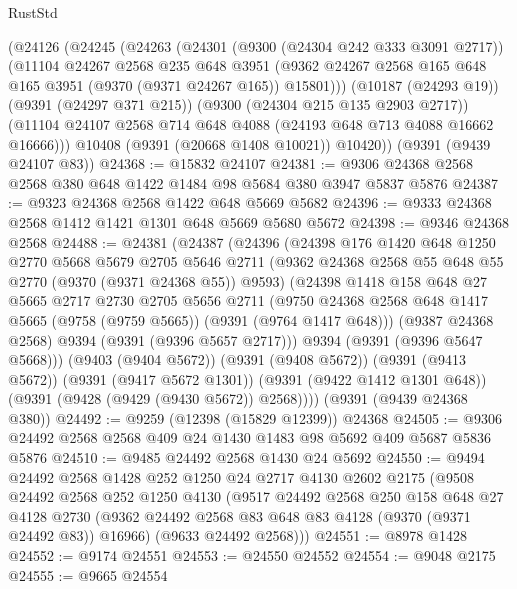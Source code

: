 \begin{lexlean}{RustStd}
\begin{coremodule}
    (@24126
      (@24245
        (@24263
          (@24301
            (@9300 (@24304 @242 @333 @3091 @2717))
            (@11104
              @24267
              @2568
              @235
              @648
              @3951
              (@9362 @24267 @2568 @165 @648 @165 @3951 (@9370 (@9371 @24267 @165)) @15801)))
          (@10187 (@24293 @19))
          (@9391 (@24297 @371 @215))
          (@9300 (@24304 @215 @135 @2903 @2717))
          (@11104 @24107 @2568 @714 @648 @4088 (@24193 @648 @713 @4088 @16662 @16666)))
        @10408
        (@9391 (@20668 @1408 @10021))
        @10420))
    (@9391 (@9439 @24107 @83))
@24368 := @15832 @24107
@24381 := @9306 @24368 @2568 @2568 @380 @648 @1422 @1484 @98 @5684 @380 @3947 @5837 @5876
@24387 := @9323 @24368 @2568 @1422 @648 @5669 @5682
@24396 := @9333 @24368 @2568 @1412 @1421 @1301 @648 @5669 @5680 @5672
@24398 := @9346 @24368 @2568
@24488 := @24381
    (@24387
      (@24396
        (@24398
          @176
          @1420
          @648
          @1250
          @2770
          @5668
          @5679
          @2705
          @5646
          @2711
          (@9362 @24368 @2568 @55 @648 @55 @2770 (@9370 (@9371 @24368 @55)) @9593)
          (@24398
            @1418
            @158
            @648
            @27
            @5665
            @2717
            @2730
            @2705
            @5656
            @2711
            (@9750 @24368 @2568 @648 @1417 @5665 (@9758 (@9759 @5665)) (@9391 (@9764 @1417 @648)))
            (@9387 @24368 @2568)
            @9394
            (@9391 (@9396 @5657 @2717)))
          @9394
          (@9391 (@9396 @5647 @5668)))
        (@9403 (@9404 @5672))
        (@9391 (@9408 @5672))
        (@9391 (@9413 @5672))
        (@9391 (@9417 @5672 @1301))
        (@9391 (@9422 @1412 @1301 @648))
        (@9391 (@9428 (@9429 (@9430 @5672)) @2568))))
    (@9391 (@9439 @24368 @380))
@24492 := @9259 (@12398 (@15829 @12399)) @24368
@24505 := @9306 @24492 @2568 @2568 @409 @24 @1430 @1483 @98 @5692 @409 @5687 @5836 @5876
@24510 := @9485 @24492 @2568 @1430 @24 @5692
@24550 := @9494
    @24492
    @2568
    @1428
    @252
    @1250
    @24
    @2717
    @4130
    @2602
    @2175
    (@9508
      @24492
      @2568
      @252
      @1250
      @4130
      (@9517
        @24492
        @2568
        @250
        @158
        @648
        @27
        @4128
        @2730
        (@9362 @24492 @2568 @83 @648 @83 @4128 (@9370 (@9371 @24492 @83)) @16966)
        (@9633 @24492 @2568)))
@24551 := @8978 @1428
@24552 := @9174 @24551
@24553 := @24550 @24552
@24554 := @9048 @2175
@24555 := @9665 @24554

\end{coremodule}
\end{lexlean}
